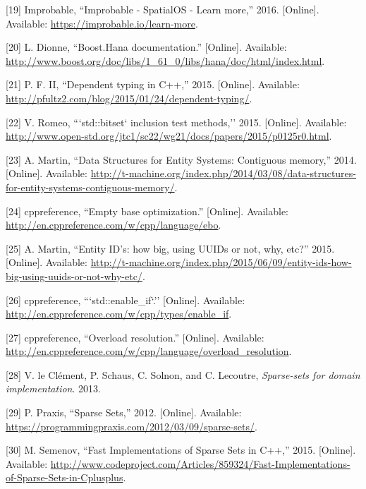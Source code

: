 \documentclass[twoside, 12pt, a4paper, openany]{book}
\begin{document}
\hypertarget{ref-spatialos_learnmore}{}
{[}19{]} Improbable, ``Improbable - SpatialOS - Learn more,'' 2016.
{[}Online{]}. Available: \url{https://improbable.io/learn-more}.

\hypertarget{ref-boosthana}{}
{[}20{]} L. Dionne, ``Boost.Hana documentation.'' {[}Online{]}.
Available:
\url{http://www.boost.org/doc/libs/1_61_0/libs/hana/doc/html/index.html}.

\hypertarget{ref-pfultz2_dependentyping}{}
{[}21{]} P. F. II, ``Dependent typing in C++,'' 2015. {[}Online{]}.
Available: \url{http://pfultz2.com/blog/2015/01/24/dependent-typing/}.

\hypertarget{ref-isocpp_proposal_p0125r0}{}
{[}22{]} V. Romeo, ```std::bitset` inclusion test methods,'' 2015.
{[}Online{]}. Available:
\url{http://www.open-std.org/jtc1/sc22/wg21/docs/papers/2015/p0125r0.html}.

\hypertarget{ref-tmachine_compstorage}{}
{[}23{]} A. Martin, ``Data Structures for Entity Systems: Contiguous
memory,'' 2014. {[}Online{]}. Available:
\url{http://t-machine.org/index.php/2014/03/08/data-structures-for-entity-systems-contiguous-memory/}.

\hypertarget{ref-cppreference_ebo}{}
{[}24{]} cppreference, ``Empty base optimization.'' {[}Online{]}.
Available: \url{http://en.cppreference.com/w/cpp/language/ebo}.

\hypertarget{ref-tmachine_eids}{}
{[}25{]} A. Martin, ``Entity ID's: how big, using UUIDs or not, why,
etc?'' 2015. {[}Online{]}. Available:
\url{http://t-machine.org/index.php/2015/06/09/entity-ids-how-big-using-uuids-or-not-why-etc/}.

\hypertarget{ref-cppreference_enable_if}{}
{[}26{]} cppreference, ```std::enable\_if`.'' {[}Online{]}. Available:
\url{http://en.cppreference.com/w/cpp/types/enable_if}.

\hypertarget{ref-cppreference_overload_resolution}{}
{[}27{]} cppreference, ``Overload resolution.'' {[}Online{]}. Available:
\url{http://en.cppreference.com/w/cpp/language/overload_resolution}.

\hypertarget{ref-sparsesets132}{}
{[}28{]} V. le Clément, P. Schaus, C. Solnon, and C. Lecoutre,
\emph{Sparse-sets for domain implementation}. 2013.

\hypertarget{ref-sparsesets_praxis}{}
{[}29{]} P. Praxis, ``Sparse Sets,'' 2012. {[}Online{]}. Available:
\url{https://programmingpraxis.com/2012/03/09/sparse-sets/}.

\hypertarget{ref-sparsesets_cpp}{}
{[}30{]} M. Semenov, ``Fast Implementations of Sparse Sets in C++,''
2015. {[}Online{]}. Available:
\url{http://www.codeproject.com/Articles/859324/Fast-Implementations-of-Sparse-Sets-in-Cplusplus}.
\end{document}
